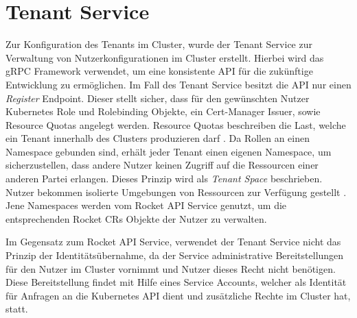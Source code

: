 \section{Tenant Service}
\label{sec:komponenten:tenant-service}
Zur Konfiguration des Tenants im Cluster, wurde der Tenant Service zur Verwaltung von Nutzerkonfigurationen im Cluster erstellt.
Hierbei wird das gRPC Framework verwendet, um eine konsistente API für die zukünftige Entwicklung zu ermöglichen.
Im Fall des Tenant Service besitzt die API nur einen \emph{Register} Endpoint.
Dieser stellt sicher, dass für den gewünschten Nutzer 
Kubernetes Role und Rolebinding Objekte, ein Cert-Manager Issuer, sowie Resource Quotas angelegt werden. 
Resource Quotas beschreiben die Last, welche ein Tenant innerhalb des Clusters produzieren darf \cite{Krebs2012}.
Da Rollen an einen Namespace gebunden sind, erhält jeder Tenant einen eigenen Namespace, um sicherzustellen,
dass andere Nutzer keinen Zugriff auf die Ressourcen einer anderen Partei erlangen.
Dieses Prinzip wird als \emph{Tenant Space} beschrieben. 
Nutzer bekommen isolierte Umgebungen von Ressourcen zur Verfügung gestellt \cite{Krebs2012}.
Jene Namespaces werden vom Rocket API Service genutzt, um die entsprechenden Rocket \acp{CR} Objekte der Nutzer zu verwalten. 

Im Gegensatz zum Rocket API Service, verwendet der Tenant Service nicht das Prinzip der Identitätsübernahme, da
der Service administrative Bereitstellungen für den Nutzer im Cluster vornimmt und Nutzer dieses Recht nicht benötigen. 
Diese Bereitstellung findet mit Hilfe eines Service Accounts, welcher als Identität für Anfragen 
an die Kubernetes API dient und zusätzliche Rechte im Cluster hat, statt. 
